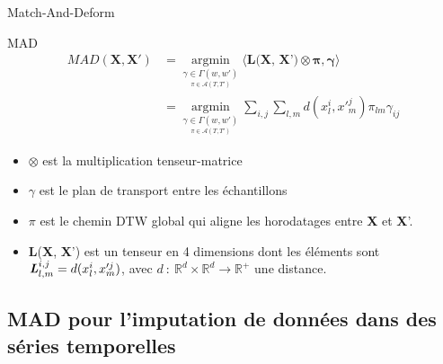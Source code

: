 \documentclass{beamer}
\begin{document}
\begin{frame}{Match-And-Deform}
    \begin{block}{MAD}
        \begin{equation*}
            \begin{split}
                MAD(\textbf{X}, \textbf{X}') & = \underset{\underset{\pi \in \mathcal{A}(T, T')}{\gamma \in \Gamma(w, w')}}{\operatorname{\arg \min}} \langle \textbf{L(X, X')} \otimes \mathbf{\pi, \gamma} \rangle \\
                & = \underset{\underset{\pi \in \mathcal{A}(T, T')}{\gamma \in \Gamma(w, w')}}{\operatorname{\arg \min}} \sum_{i,j} \sum_{l,m} d(x^i_l, x'^j_m) \pi_{lm} \gamma_{ij}
            \end{split}
        \end{equation*}
    \end{block}
    \begin{itemize}
        \item $\otimes$ est la multiplication tenseur-matrice
        \item $\gamma$ est le plan de transport entre les échantillons
        \item $\pi$ est le chemin DTW global qui aligne les horodatages entre \textbf{X} et \textbf{X}'.
        \item \textbf{L}(\textbf{X}, \textbf{X}') est un tenseur en 4 dimensions dont les éléments sont $\textbf{\textit{L}}^{i,j}_{l,m} = d(x^i_l, x'^j_m)$, 
              avec $d\: :\: \mathds{R}^d \times \mathds{R}^d \rightarrow \mathds{R}^+$ une distance.
    \end{itemize}
\end{frame}


\subsection{MAD pour l'imputation de données dans des séries temporelles}
\end{document}
